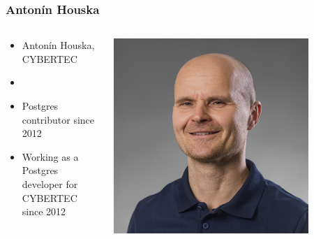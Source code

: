 \newcommand{\linksize}{\scriptsize}


\begin{frame}[plain]
  \titlepage
\end{frame}

\begin{frame}
  \frametitle{Antonín Houska}

  \begin{columns}[T]
    \begin{column}{0.8\textwidth}
      \begin{itemize}
	\item Antonín Houska, CYBERTEC
	\item \href{mailto:ah@cybertec.at}{\color{black}{ah@cybertec.at}}
	\item Postgres contributor since 2012
	\item Working as a Postgres developer for CYBERTEC since 2012
      \end{itemize}
    \end{column}
    \begin{column}{0.2\textwidth}
      \includegraphics[width=0.8\textwidth]{Antonin-Houska-faceshot.jpg}
    \end{column}
  \end{columns}
\end{frame}

